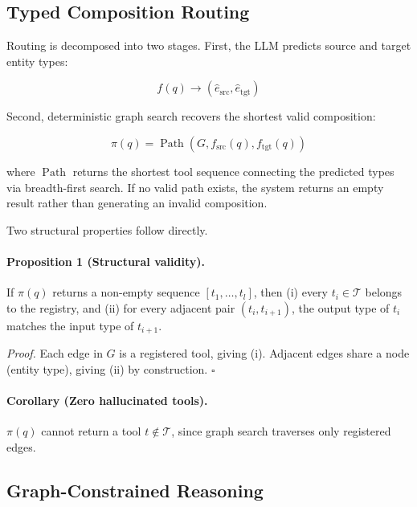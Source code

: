 \subsection{Typed Composition Routing}
\label{sec:tcr}

Routing is decomposed into two stages.
First, the LLM predicts source and target entity types:

\begin{equation}
    f(q)
    \rightarrow
    (\hat e_{\mathrm{src}},
     \hat e_{\mathrm{tgt}})
    \label{eq:type-prediction}
\end{equation}

Second, deterministic graph search recovers the shortest valid composition:

\begin{equation}
    \pi(q)
    =
    \operatorname{Path}
    \left(
        G,
        f_{\mathrm{src}}(q),
        f_{\mathrm{tgt}}(q)
    \right)
    \label{eq:routing-function}
\end{equation}

where $\operatorname{Path}$ returns the shortest tool sequence connecting the predicted types via breadth-first search.
If no valid path exists, the system returns an empty result rather than generating an invalid composition.

Two structural properties follow directly.

\paragraph{Proposition 1 (Structural validity).}
If $\pi(q)$ returns a non-empty sequence $[t_1, \ldots, t_l]$, then (i) every $t_i \in \mathcal{T}$ belongs to the registry, and (ii) for every adjacent pair $(t_i, t_{i+1})$, the output type of $t_i$ matches the input type of $t_{i+1}$.

\emph{Proof.}
Each edge in $G$ is a registered tool, giving (i).
Adjacent edges share a node (entity type), giving (ii) by construction. \hfill $\square$

\paragraph{Corollary (Zero hallucinated tools).}
$\pi(q)$ cannot return a tool $t \notin \mathcal{T}$, since graph search traverses only registered edges.

\subsection{Graph-Constrained Reasoning}
\label{sec:graph-constraint}


